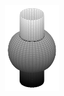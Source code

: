 \begin{example}
{    \includegraphics[width=\linewidth]{Images/Capitulo1/Dominio_de_funcion3d.pdf}
    }
\end{example}

